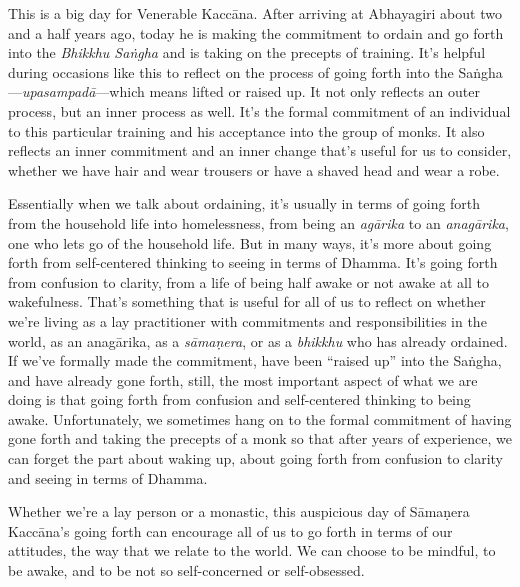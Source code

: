 This is a big day for Venerable Kaccāna. After arriving at Abhayagiri 
about two and a half years ago, today he is making the commitment to 
ordain and go forth into the \emph{Bhikkhu Saṅgha} and is taking on 
the precepts of training. It's helpful during occasions like this to 
reflect on the process of going forth into the 
Saṅgha---\emph{upasampadā}---which means lifted or raised up. It not 
only reflects an outer process, but an inner process as well. It's the 
formal commitment of an individual to this particular training and his 
acceptance into the group of monks. It also reflects an inner 
commitment and an inner change that's useful for us to consider, 
whether we have hair and wear trousers or have a shaved head and wear a 
robe.

Essentially when we talk about ordaining, it's usually in terms of 
going forth from the household life into homelessness, from being an 
\emph{agārika} to an \emph{anagārika}, one who lets go of the 
household life. But in many ways, it's more about going forth from 
self-centered thinking to seeing in terms of Dhamma. It's going forth 
from confusion to clarity, from a life of being half awake or not awake 
at all to wakefulness. That's something that is useful for all of us to 
reflect on whether we're living as a lay practitioner with commitments 
and responsibilities in the world, as an anagārika, as a 
\emph{sāmaṇera}, or as a \emph{bhikkhu} who has already ordained. If 
we've formally made the commitment, have been ``raised up'' into the 
Saṅgha, and have already gone forth, still, the most important aspect 
of what we are doing is that going forth from confusion and 
self-centered thinking to being awake. Unfortunately, we sometimes hang 
on to the formal commitment of having gone forth and taking the 
precepts of a monk so that after years of experience, we can forget the 
part about waking up, about going forth from confusion to clarity and 
seeing in terms of Dhamma.

Whether we're a lay person or a monastic, this auspicious day of 
Sāmaṇera Kaccāna's going forth can encourage all of us to go forth 
in terms of our attitudes, the way that we relate to the world. We can 
choose to be mindful, to be awake, and to be not so self-concerned or 
self-obsessed.

